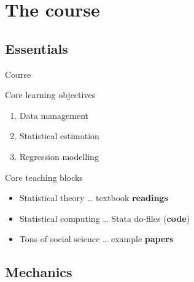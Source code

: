 \documentclass[t]{beamer}
\begin{document}
  \section{The course}
	
  \subsection{Essentials}
  
  \begin{frame}[t]{Course }

    \begin{block}{Core learning objectives}
      \begin{enumerate}
        \item Data management
        \item Statistical estimation
        \item Regression modelling
      \end{enumerate} 
    \end{block}
  
    \begin{block}{Core teaching blocks}
      \begin{itemize}
        \item Statistical theory      \hfill … textbook \textbf{readings}
        \item Statistical computing   \hfill … Stata do-files (\textbf{code})
        \item Tons of social science  \hfill … example \textbf{papers}
      \end{itemize}   
    \end{block}
    
  \end{frame}

  \subsection{Mechanics}
	
\end{document}
